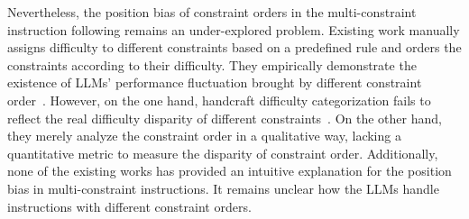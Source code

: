 Nevertheless, the position bias of constraint orders in the multi-constraint instruction following remains an under-explored problem. Existing work manually assigns difficulty to different constraints based on a predefined rule and orders the constraints according to their difficulty. They empirically demonstrate the existence of LLMs' performance fluctuation brought by different constraint order~\cite{chen2024sifo}. However, on the one hand, handcraft difficulty categorization fails to reflect the real difficulty disparity of different constraints~\cite{dentella2024testing, srivastava2023beyond}. On the other hand, they merely analyze the constraint order in a qualitative way, lacking a quantitative metric to measure the disparity of constraint order. Additionally, none of the existing works has provided an intuitive explanation for the position bias in multi-constraint instructions. It remains unclear how the LLMs handle instructions with different constraint orders.





